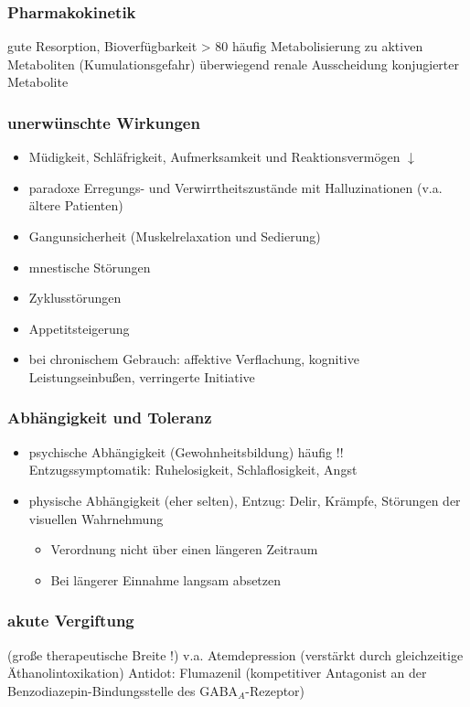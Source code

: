 \documentclass[10pt,a4paper]{report}
\begin{document}
\subsubsection{Pharmakokinetik} %
\label{ssub:pharmakokinetik}
gute Resorption, Bioverfügbarkeit > 80 %
häufig Metabolisierung zu aktiven Metaboliten (Kumulationsgefahr)
überwiegend renale Ausscheidung konjugierter Metabolite
\subsubsection{unerwünschte Wirkungen} %
\label{ssub:unerw_nschte_wirkungen}
\begin{itemize}
	\item Müdigkeit, Schläfrigkeit, Aufmerksamkeit und Reaktionsvermögen $\downarrow$
	\item 	paradoxe Erregungs- und Verwirrtheitszustände mit Halluzinationen (v.a. ältere Patienten)
	\item Gangunsicherheit (Muskelrelaxation und Sedierung)
	\item mnestische Störungen	
	\item Zyklusstörungen
	\item Appetitsteigerung
	\item bei chronischem Gebrauch: affektive Verflachung, kognitive Leistungseinbußen, verringerte Initiative
\end{itemize}
\subsubsection{Abhängigkeit und Toleranz} %
\label{ssub:abh_ngigkeit_und_toleranz}
\begin{itemize}
	\item psychische Abhängigkeit (Gewohnheitsbildung) häufig !! Entzugssymptomatik: Ruhelosigkeit, Schlaflosigkeit, Angst
	\item physische Abhängigkeit (eher selten), Entzug: Delir, Krämpfe, Störungen der visuellen Wahrnehmung
	\begin{itemize}
		\item Verordnung nicht über einen längeren Zeitraum
		\item Bei längerer Einnahme langsam absetzen
	\end{itemize}
\end{itemize}
\subsubsection{akute Vergiftung} %
\label{ssub:akute_vergiftung}
(große therapeutische Breite !) v.a. Atemdepression (verstärkt durch gleichzeitige Äthanolintoxikation) Antidot: Flumazenil (kompetitiver Antagonist an der Benzodiazepin-Bindungsstelle des GABA$_A$-Rezeptor)
\end{document}
